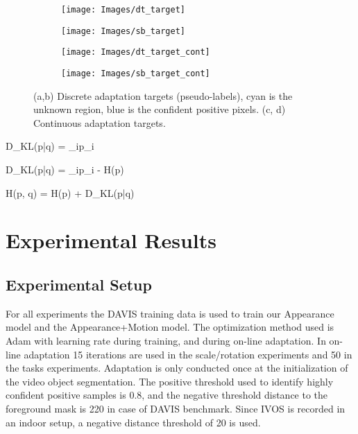 \documentclass[letterpaper, 10 pt, conference]{ieeeconf}
\begin{document}
\begin{figure}[ht!]
\centering
\begin{subfigure}{.23\textwidth}
    \texttt{[image: Images/dt\_target]}
    \caption{}
\end{subfigure}\begin{subfigure}{.23\textwidth}
    \texttt{[image: Images/sb\_target]}
    \caption{}
\end{subfigure}

\begin{subfigure}{.23\textwidth}
    \texttt{[image: Images/dt\_target\_cont]}
    \caption{}
\end{subfigure}\begin{subfigure}{.23\textwidth}
    \texttt{[image: Images/sb\_target\_cont]}
    \caption{}
\end{subfigure}
\caption{(a,b) Discrete adaptation targets (pseudo-labels), cyan is the unknown region, blue is the confident positive pixels. (c, d) Continuous adaptation targets.}
\label{fig:adapt}
\end{figure}


D_{KL}(p|q) = \sum_i{p_i }

D_{KL}(p|q) = \sum_i{p_i } - H(p)

H(p, q) = H(p) + D_{KL}(p|q)
 
\section{Experimental Results}
\subsection{Experimental Setup}
For all experiments the DAVIS training data is used to train our Appearance model and the Appearance+Motion model. The optimization method used is Adam \cite{kingma2014adam} with learning rate  during training, and  during on-line adaptation. In on-line adaptation 15 iterations are used in the scale/rotation experiments and 50 in the tasks experiments. Adaptation is only conducted once at the initialization of the video object segmentation. The positive threshold used to identify highly confident positive samples is 0.8, and the negative threshold distance to the foreground mask is 220 in case of DAVIS benchmark. Since IVOS is recorded in an indoor setup, a negative distance threshold of 20 is used.
\end{document}
